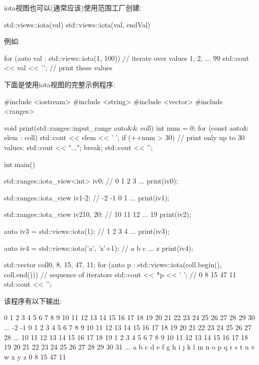 
iota视图也可以(通常应该)使用范围工厂创建:

\begin{cpp}
std::views::iota(val)
std::views::iota(val, endVal)
\end{cpp}

例如:

\begin{cpp}
for (auto val : std::views::iota(1, 100)) { // iterate over values 1, 2, ... 99
	std::cout << val << '\n'; // print these values
}
\end{cpp}

下面是使用iota视图的完整示例程序:


\begin{cpp}
#include <iostream>
#include <string>
#include <vector>
#include <ranges>

void print(std::ranges::input_range auto&& coll)
{
	int num = 0;
	for (const auto& elem : coll) {
		std::cout << elem << ' ';
		if (++num > 30) { // print only up to 30 values:
			std::cout << "...";
			break;
		}
	}
	std::cout << '\n';
}

int main()
{
	std::ranges::iota_view<int> iv0; // 0 1 2 3 ...
	print(iv0);
	
	std::ranges::iota_view iv1{-2}; // -2 -1 0 1 ...
	print(iv1);
	
	std::ranges::iota_view iv2{10, 20}; // 10 11 12 ... 19
	print(iv2);
	
	auto iv3 = std::views::iota(1); // 1 2 3 4 ...
	print(iv3);
	
	auto iv4 = std::views::iota('a', 'z'+1); // a b c ... z
	print(iv4);
	
	std::vector coll{0, 8, 15, 47, 11};
	for (auto p : std::views::iota(coll.begin(), coll.end())) { // sequence of iterators
		std::cout << *p << ' '; // 0 8 15 47 11
	}
	std::cout << '\n';
}
\end{cpp}

该程序有以下输出:

\begin{shell}
0 1 2 3 4 5 6 7 8 9 10 11 12 13 14 15 16 17 18 19 20 21 22 23 24 25 26 27 28 29 30 ...
-2 -1 0 1 2 3 4 5 6 7 8 9 10 11 12 13 14 15 16 17 18 19 20 21 22 23 24 25 26 27 28 ...
10 11 12 13 14 15 16 17 18 19
1 2 3 4 5 6 7 8 9 10 11 12 13 14 15 16 17 18 19 20 21 22 23 24 25 26 27 28 29 30 31 ...
a b c d e f g h i j k l m n o p q r s t u v w x y z
0 8 15 47 11	
\end{shell}

